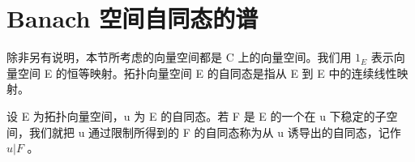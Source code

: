 \section{Banach 空间自同态的谱}

除非另有说明，本节所考虑的向量空间都是 C 上的向量空间。我们用 \(1_{E}\) 表示向量空间 E 的恒等映射。拓扑向量空间 E 的自同态是指从 E 到 E 中的连续线性映射。

设 E 为拓扑向量空间，u 为 E 的自同态。若 F 是 E 的一个在 u 下稳定的子空间，我们就把 u 通过限制所得到的 F 的自同态称为从 u 诱导出的自同态，记作 \(u|F\) 。

